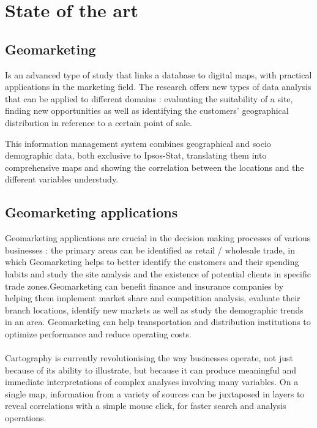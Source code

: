 
\section{State of the art}
\subsection{Geomarketing}
Is an advanced type of study that links a database to digital maps, with
practical applications in the marketing field. The research offers new types of
data analysis that can be applied to different domains : evaluating the
suitability of a site, finding new opportunities as well as identifying the
customers' geographical distribution in reference to a certain point of sale.

This information management system combines geographical and socio demographic
data, both exclusive to Ipsos-Stat, translating them into comprehensive maps and
showing the correlation between the locations and the different variables
understudy.

\subsection{Geomarketing applications}
Geomarketing applications are crucial in the decision making processes of various
businesses : the primary areas can be identified as retail / wholesale trade, in
which Geomarketing helps to better identify the customers and their spending
habits and study the site analysis and the existence of potential clients in
specific trade zones.Geomarketing can benefit finance and insurance companies by
helping them implement market share and competition analysis, evaluate their
branch locations, identify new markets as well as study the demographic trends in
an area. Geomarketing can help transportation and distribution institutions to
optimize performance and reduce operating costs.
\\\\
Cartography is currently revolutionising the way businesses operate, not just
because of its ability to illustrate, but because it can produce meaningful and
immediate interpretations of complex analyses involving many variables. On a
single map, information from a variety of sources can be juxtaposed in layers to
reveal correlations with a simple mouse click, for faster search and analysis
operations.

